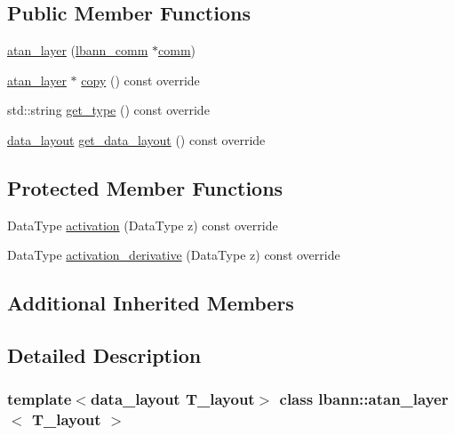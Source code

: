 \subsection*{Public Member Functions}
\begin{DoxyCompactItemize}
\item 
\hyperlink{classlbann_1_1atan__layer_a8cd5a9ea7688bde095ca6745d372fd4a}{atan\+\_\+layer} (\hyperlink{classlbann_1_1lbann__comm}{lbann\+\_\+comm} $\ast$\hyperlink{file__io_8cpp_ab048c6f9fcbcfaa57ce68b00263dbebe}{comm})
\item 
\hyperlink{classlbann_1_1atan__layer}{atan\+\_\+layer} $\ast$ \hyperlink{classlbann_1_1atan__layer_accb8ca944735c1c7acccecc188fe100b}{copy} () const override
\item 
std\+::string \hyperlink{classlbann_1_1atan__layer_a4971aa6ba30e72d0e589993621c925a0}{get\+\_\+type} () const override
\item 
\hyperlink{base_8hpp_a786677cbfb3f5677b4d84f3056eb08db}{data\+\_\+layout} \hyperlink{classlbann_1_1atan__layer_ad749b9e41c9b29c98adbad599274e7c9}{get\+\_\+data\+\_\+layout} () const override
\end{DoxyCompactItemize}
\subsection*{Protected Member Functions}
\begin{DoxyCompactItemize}
\item 
Data\+Type \hyperlink{classlbann_1_1atan__layer_acb40bcd43b2c974b1355a93aea1c5290}{activation} (Data\+Type z) const override
\item 
Data\+Type \hyperlink{classlbann_1_1atan__layer_a2df8ba467a7375eab14d1b821e1386f0}{activation\+\_\+derivative} (Data\+Type z) const override
\end{DoxyCompactItemize}
\subsection*{Additional Inherited Members}


\subsection{Detailed Description}
\subsubsection*{template$<$data\+\_\+layout T\+\_\+layout$>$\newline
class lbann\+::atan\+\_\+layer$<$ T\+\_\+layout $>$}

